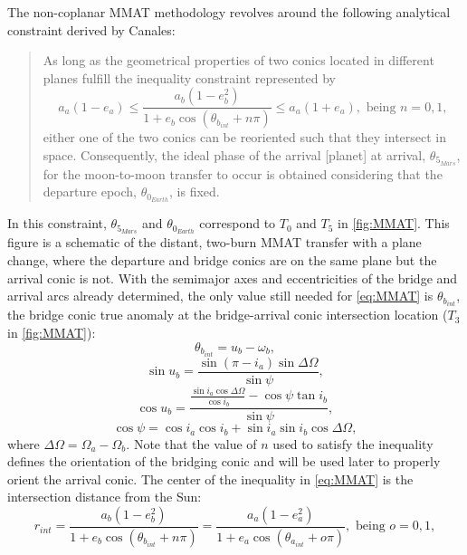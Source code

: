 The non-coplanar MMAT methodology revolves around the following analytical constraint derived by
Canales\cite{Canales:2021b}:
\begin{quote}
    As long as the geometrical properties of two conics located in different planes fulfill the
    inequality constraint represented by
    \begin{equation}
        a_{a}(1-e_{a})\leq\frac{a_{b}(1-e_{b}^{2})}{1+e_{b}\cos(\theta_{b_{int}}+n\pi)}\leq a_{a}(1+e_{a}),\text{ being }n=0,1,
        \label{eq:MMAT}
    \end{equation}
    either one of the two conics can be reoriented such that they intersect in space. Consequently,
    the ideal phase of the arrival [planet] at arrival, $\theta_{5_{Mars}}$, for the moon-to-moon
    transfer to occur is obtained considering that the departure epoch, $\theta_{0_{Earth}}$, is
    fixed.
\end{quote}
In this constraint, $\theta_{5_{Mars}}$ and $\theta_{0_{Earth}}$ correspond to $T_{0}$ and $T_{5}$
in \cref{fig:MMAT}. This figure is a schematic of the distant, two-burn MMAT transfer with a plane
change, where the departure and bridge conics are on the same plane but the arrival conic is not.
With the semimajor axes and eccentricities of the bridge and arrival arcs already determined, the
only value still needed for \cref{eq:MMAT} is $\theta_{b_{int}}$, the bridge conic true anomaly at
the bridge-arrival conic intersection location ($T_{3}$ in \cref{fig:MMAT}):
\begin{equation}
    \theta_{b_{int}}=u_{b}-\omega_{b},
    \label{eq:bridgeintersect}
\end{equation}
\begin{equation}
    \sin u_{b}=\frac{\sin(\pi-i_{a})\sin\Delta\Omega}{\sin\psi},
    \label{eq:bridgesinu}
\end{equation}
\begin{equation}
    \cos u_{b}=\frac{\frac{\sin i_{a}\cos\Delta\Omega}{\cos i_{b}}-\cos\psi\tan i_{b}}{\sin\psi},
    \label{eq:bridgecosu}
\end{equation}
\begin{equation}
    \cos\psi=\cos i_{a}\cos i_{b}+\sin i_{a}\sin i_{b}\cos\Delta\Omega,
\end{equation}
where $\Delta\Omega=\Omega_{a}-\Omega_{b}$. Note that the value of $n$ used to satisfy the
inequality defines the orientation of the bridging conic and will be used later to properly orient
the arrival conic. The center of the inequality in \cref{eq:MMAT} is the intersection distance from
the Sun:
\begin{equation}
    r_{int}=\frac{a_{b}(1-e_{b}^{2})}{1+e_{b}\cos(\theta_{b_{int}}+n\pi)}=\frac{a_{a}(1-e_{a}^{2})}{1+e_{a}\cos(\theta_{a_{int}}+o\pi)}, \text{ being }o=0,1,
    \label{eq:intersect}
\end{equation}

